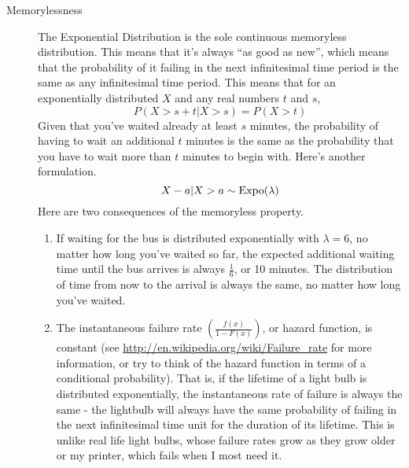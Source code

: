 \documentclass[11pt]{article}
\begin{document}
\begin{description}
\begin{description}
  \item[Memorylessness] The Exponential Distribution is the sole continuous memoryless distribution. This means that it's always ``as good as new'', which means that the probability of it failing in the next infinitesimal time period is the same as any infinitesimal time period. This means that for an exponentially distributed $X$ and any real numbers $t$ and $s$,
  \[P(X > s + t | X > s) = P(X > t)\]
  Given that you've waited already at least $s$ minutes, the probability of having to wait an additional $t$ minutes is the same as the probability that you have to wait more than $t$ minutes to begin with. Here's another formulation.
  \[X - a | X > a \sim \textrm{Expo}(\lambda)\]
  Here are two consequences of the memoryless property.
  \begin{enumerate}
    \item If waiting for the bus is distributed exponentially with $\lambda = 6$, no matter how long you've waited so far, the expected additional waiting time until the bus arrives is always $\frac{1}{6}$, or 10 minutes. The distribution of time from now to the arrival is always the same, no matter how long you've waited.
    \item The instantaneous failure rate $\left(\frac{f(x)}{1-F(x)}\right)$, or hazard function, is constant (see \url{http://en.wikipedia.org/wiki/Failure_rate} for more information, or try to think of the hazard function in terms of a conditional probability). That is, if the lifetime of a light bulb is distributed exponentially, the instantaneous rate of failure is always the same - the lightbulb will always have the same probability of failing in the next infinitesimal time unit for the duration of its lifetime. This is unlike real life light bulbs, whose failure rates grow as they grow older or my printer, which fails when I most need it.
  \end{enumerate}

\end{description}
\end{description}
\end{document}
